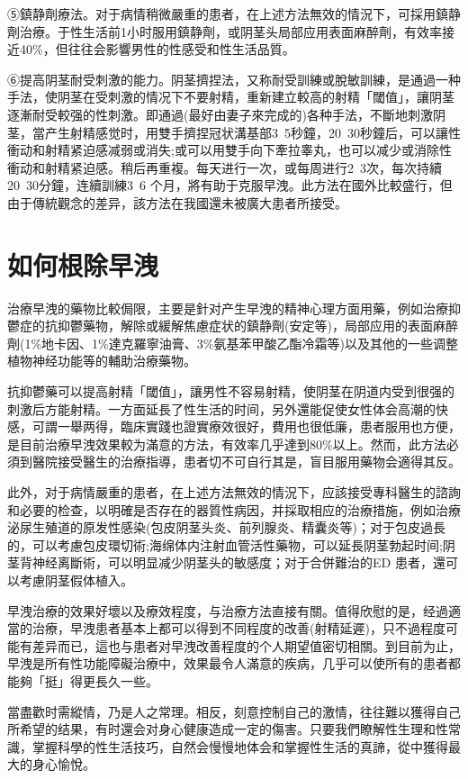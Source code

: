 \documentclass[12pt,UTF8]{ctexbook}
\begin{document}
⑤鎮静劑療法。对于病情稍微嚴重的患者，在上述方法無效的情況下，可採用鎮静劑治療。于性生活前1小时服用鎮静劑，或阴茎头局部应用表面麻醉劑，有效率接近40\%，但往往会影響男性的性感受和性生活品質。

⑥提高阴茎耐受刺激的能力。阴茎擠捏法，又称耐受訓練或脫敏訓練，是通過一种手法，使阴茎在受刺激的情况下不要射精，重新建立較高的射精「閾值」，讓阴茎逐漸耐受較强的性刺激。即通過(最好由妻子來完成的)各种手法，不斷地刺激阴茎，當产生射精感觉时，用雙手擠捏冠状溝基部3~5秒鐘，20~30秒鐘后，可以讓性衝动和射精紧迫感减弱或消失;或可以用雙手向下牽拉睾丸，也可以减少或消除性衝动和射精紧迫感。稍后再重複。每天进行一次，或每周进行2~3次，每次持續20~30分鐘，连續訓練3~6 个月，將有助于克服早洩。此方法在國外比較盛行，但由于傳統觀念的差异，該方法在我國還未被廣大患者所接受。

\section{如何根除早洩}

治療早洩的藥物比較侷限，主要是針对产生早洩的精神心理方面用藥，例如治療抑鬱症的抗抑鬱藥物，解除或緩解焦慮症状的鎮静劑(安定等)，局部应用的表面麻醉劑(1\%地卡因、1\%達克羅寧油膏、3\%氨基苯甲酸乙酯冷霜等)以及其他的一些调整植物神经功能等的輔助治療藥物。

抗抑鬱藥可以提高射精「閾值」，讓男性不容易射精，使阴茎在阴道内受到很强的刺激后方能射精。一方面延長了性生活的时间，另外還能促使女性体会高潮的快感，可謂一舉两得，臨床實踐也證實療效很好，費用也很低廉，患者服用也方便，是目前治療早洩效果較为滿意的方法，有效率几乎達到80\%以上。然而，此方法必須到醫院接受醫生的治療指導，患者切不可自行其是，盲目服用藥物会適得其反。

此外，对于病情嚴重的患者，在上述方法無效的情況下，应該接受專科醫生的諮詢和必要的检查，以明確是否存在的器質性病因，并採取相应的治療措施，例如治療泌尿生殖道的原发性感染(包皮阴茎头炎、前列腺炎、精囊炎等)；对于包皮過長的，可以考慮包皮環切術;海绵体内注射血管活性藥物，可以延長阴茎勃起时间;阴茎背神经离斷術，可以明显减少阴茎头的敏感度；对于合併難治的ED 患者，還可以考慮阴茎假体植入。

早洩治療的效果好壞以及療效程度，与治療方法直接有關。值得欣慰的是，经過適當的治療，早洩患者基本上都可以得到不同程度的改善(射精延遲)，只不過程度可能有差异而已，這也与患者对早洩改善程度的个人期望值密切相關。到目前为止，早洩是所有性功能障礙治療中，效果最令人滿意的疾病，几乎可以使所有的患者都能夠「挺」得更長久一些。

當盡歡时需縱情，乃是人之常理。相反，刻意控制自己的激情，往往難以獲得自己所希望的结果，有时還会对身心健康造成一定的傷害。只要我們瞭解性生理和性常識，掌握科學的性生活技巧，自然会慢慢地体会和掌握性生活的真諦，從中獲得最大的身心愉悅。
\end{document}
